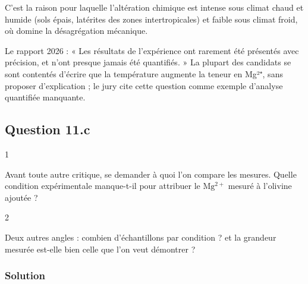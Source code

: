 \documentclass[11pt,a4paper]{article}
\begin{document}
C'est la raison pour laquelle l'altération chimique est intense sous climat chaud et humide (sols épais, latérites des zones intertropicales) et faible sous climat froid, où domine la désagrégation mécanique.

\begin{jury}

Le rapport 2026 : « Les résultats de l'expérience ont rarement été présentés avec précision, et n'ont presque jamais été quantifiés. » La plupart des candidats se sont contentés d'écrire que la température augmente la teneur en Mg²⁺, sans proposer d'explication ; le jury cite cette question comme exemple d'analyse quantifiée manquante.

\end{jury}

\hypertarget{question-11.c}{%
\subsection{Question 11.c}\label{question-11.c}}

\begin{indication}{1}

Avant toute autre critique, se demander à quoi l'on compare les mesures. Quelle condition expérimentale manque-t-il pour attribuer le \(\mathrm{Mg^{2+}}\) mesuré à l'olivine ajoutée ?

\end{indication}

\begin{indication}{2}

Deux autres angles : combien d'échantillons par condition ? et la grandeur mesurée est-elle bien celle que l'on veut démontrer ?

\end{indication}

\hypertarget{solution-38}{%
\subsubsection{Solution}\label{solution-38}}
\end{document}
